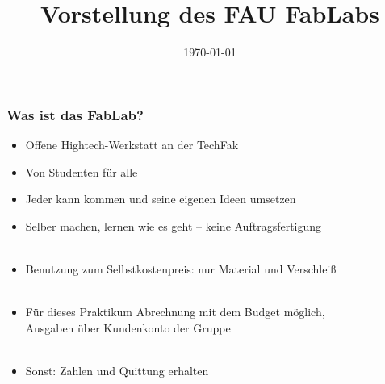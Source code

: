 \documentclass[t]{beamer}
\begin{document}


\date{\today}
\title[Vorstellung]{Vorstellung des FAU FabLabs}
\author{} %
\frame[plain,c]{\titlepage} %




\begin{frame}
    \frametitle{Was ist das FabLab?}
    \begin{itemize}
        \item Offene Hightech-Werkstatt an der TechFak
        \item Von Studenten für alle
        \item Jeder kann kommen und seine eigenen Ideen umsetzen
        \item Selber machen, lernen wie es geht -- keine Auftragsfertigung\\~
        \item Benutzung zum Selbstkostenpreis: nur Material und Verschleiß\\~
        \item Für dieses Praktikum Abrechnung mit dem Budget möglich,\\
        Ausgaben über Kundenkonto der Gruppe\\~
        \item Sonst: Zahlen und Quittung erhalten
    \end{itemize}

\end{frame}

%
%
\end{document}
